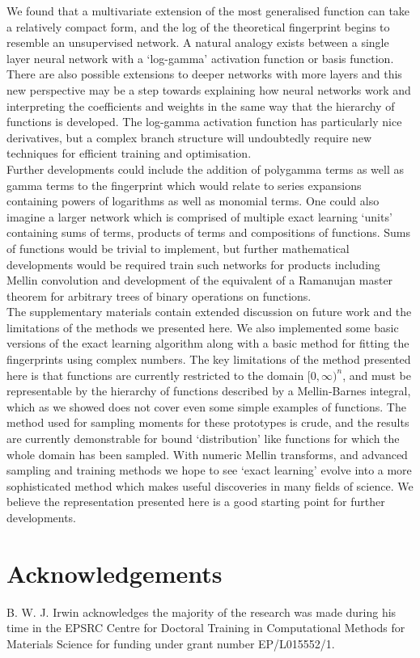 \documentclass{article}
\begin{document}
We found that a multivariate extension of the most generalised function can take a relatively compact form, and the log of the theoretical fingerprint begins to resemble an unsupervised network. A natural analogy exists between a single layer neural network with a `log-gamma' activation function or basis function. There are also possible extensions to deeper networks with more layers and this new perspective may be a step towards explaining how neural networks work and interpreting the coefficients and weights in the same way that the hierarchy of functions is developed. The log-gamma activation function has particularly nice derivatives, but a complex branch structure will undoubtedly require new techniques for efficient training and optimisation.\\

Further developments could include the addition of polygamma terms as well as gamma terms to the fingerprint which would relate to series expansions containing powers of logarithms as well as monomial terms. One could also imagine a larger network which is comprised of multiple exact learning `units' containing sums of terms, products of terms and compositions of functions. Sums of functions would be trivial to implement, but further mathematical developments would be required train such networks for products including Mellin convolution and development of the equivalent of a Ramanujan master theorem for arbitrary trees of binary operations on functions.\\

The supplementary materials contain extended discussion on future work and the limitations of the methods we presented here. We also implemented some basic versions of the exact learning algorithm along with a basic method for fitting the fingerprints using complex numbers. The key limitations of the method presented here is that functions are currently restricted to the domain $[0,\infty)^n$, and must be representable by the hierarchy of functions described by a Mellin-Barnes integral, which as we showed does not cover even some simple examples of functions. The method used for sampling moments for these prototypes is crude, and the results are currently demonstrable for bound `distribution' like functions for which the whole domain has been sampled. With numeric Mellin transforms, and advanced sampling and training methods we hope to see `exact learning' evolve into a more sophisticated method which makes useful discoveries in many fields of science. We believe the representation presented here is a good starting point for further developments.


\section{Acknowledgements}
B. W. J. Irwin acknowledges the majority of the research was made during his time in the EPSRC Centre for Doctoral Training in Computational Methods for Materials Science for funding under grant number EP/L015552/1.


{}

\end{document}
